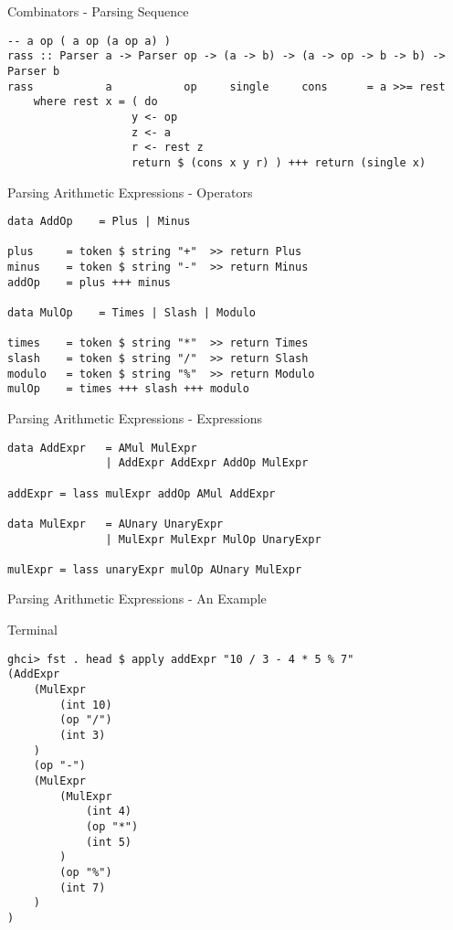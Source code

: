 \documentclass[12pt]{beamer}
\newcommand{\codesize}{\fontsize{7.7}{7.7}}
\begin{document}
\begin{spacing}{1.3}
\begin{frame}[fragile=singleslide]{Combinators - Parsing Sequence}
\begin{verbatim}
-- a op ( a op (a op a) )
rass :: Parser a -> Parser op -> (a -> b) -> (a -> op -> b -> b) -> Parser b
rass           a           op     single     cons      = a >>= rest
    where rest x = ( do
                   y <- op
                   z <- a
                   r <- rest z
                   return $ (cons x y r) ) +++ return (single x)
\end{verbatim}
\end{frame}

\begin{frame}[fragile=singleslide]{Parsing Arithmetic Expressions - Operators}
\begin{verbatim}
data AddOp    = Plus | Minus

plus     = token $ string "+"  >> return Plus
minus    = token $ string "-"  >> return Minus
addOp    = plus +++ minus

data MulOp    = Times | Slash | Modulo

times    = token $ string "*"  >> return Times
slash    = token $ string "/"  >> return Slash
modulo   = token $ string "%"  >> return Modulo
mulOp    = times +++ slash +++ modulo
\end{verbatim}
\end{frame}

\begin{frame}[fragile=singleslide]{Parsing Arithmetic Expressions - Expressions}
\begin{verbatim}
data AddExpr   = AMul MulExpr
               | AddExpr AddExpr AddOp MulExpr

addExpr = lass mulExpr addOp AMul AddExpr

data MulExpr   = AUnary UnaryExpr
               | MulExpr MulExpr MulOp UnaryExpr

mulExpr = lass unaryExpr mulOp AUnary MulExpr
\end{verbatim}
\end{frame}



\begin{frame}[fragile=singleslide]{Parsing Arithmetic Expressions - An Example}
\begin{block}{Terminal}
\begin{verbatim}
ghci> fst . head $ apply addExpr "10 / 3 - 4 * 5 % 7"
(AddExpr
    (MulExpr
        (int 10)
        (op "/")
        (int 3)
    )
    (op "-")
    (MulExpr
        (MulExpr
            (int 4)
            (op "*")
            (int 5)
        )
        (op "%")
        (int 7)
    )
)
\end{verbatim}
\end{block}
\end{frame}


\end{spacing}
\end{document}
